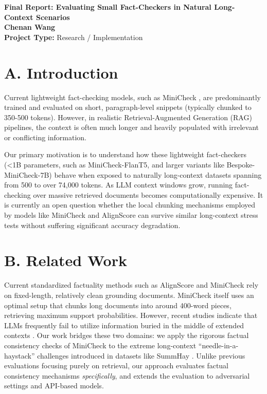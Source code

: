 \documentclass[12pt, letterpaper]{article}
\begin{document}
\begin{center}
    \textbf{\Large Final Report: Evaluating Small Fact-Checkers in Natural Long-Context Scenarios} \\
    \vspace{0.5em}
    \textbf{Chenan Wang} \\
    \textbf{Project Type:} Research / Implementation
\end{center}

\vspace{1em}

\section*{A. Introduction}

Current lightweight fact-checking models, such as MiniCheck \cite{tang2024minicheck}, are predominantly trained and evaluated on short, paragraph-level snippets (typically chunked to 350-500 tokens). However, in realistic Retrieval-Augmented Generation (RAG) pipelines, the context is often much longer and heavily populated with irrelevant or conflicting information.

Our primary motivation is to understand how these lightweight fact-checkers (\textless1B parameters, such as MiniCheck-FlanT5, and larger variants like Bespoke-MiniCheck-7B) behave when exposed to naturally long-context datasets spanning from 500 to over 74,000 tokens. As LLM context windows grow, running fact-checking over massive retrieved documents becomes computationally expensive. It is currently an open question whether the local chunking mechanisms employed by models like MiniCheck \cite{tang2024minicheck} and AlignScore \cite{zha2023alignscore} can survive similar long-context stress tests without suffering significant accuracy degradation.

\section*{B. Related Work}

Current standardized factuality methods such as AlignScore \cite{zha2023alignscore} and MiniCheck \cite{tang2024minicheck} rely on fixed-length, relatively clean grounding documents. MiniCheck itself uses an optimal setup that chunks long documents into around 400-word pieces, retrieving maximum support probabilities. However, recent studies indicate that LLMs frequently fail to utilize information buried in the middle of extended contexts \cite{laban2024summary}. Our work bridges these two domains: we apply the rigorous factual consistency checks of MiniCheck to the extreme long-context ``needle-in-a-haystack'' challenges introduced in datasets like SummHay \cite{laban2024summary}. Unlike previous evaluations focusing purely on retrieval, our approach evaluates factual consistency mechanisms \textit{specifically}, and extends the evaluation to adversarial settings and API-based models.
\end{document}
